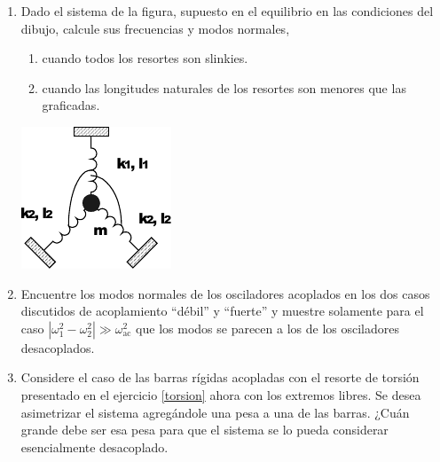 \documentclass[11pt,spanish,a4paper]{article}
\begin{document}
\begin{enumerate}
\item Dado el sistema de la figura, supuesto en el equilibrio en las condiciones del dibujo, calcule sus frecuencias y modos normales,
	\begin{enumerate}
		\item cuando todos los resortes son slinkies.
		\item cuando las longitudes naturales de los resortes son menores que las graficadas.
	\end{enumerate}
    \begin{center}
		\includegraphics[width=0.25\linewidth]{g02e07}
	\end{center}


\item Encuentre los modos normales de los osciladores acoplados en los dos casos discutidos de acoplamiento ``débil'' y ``fuerte'' y muestre solamente para el caso \(\left| \omega_1^2 - \omega_2^2 \right|\gg \omega_\mathrm{ac}^2 \) que los modos se parecen a los de los osciladores desacoplados.


\item Considere el caso de las barras rígidas acopladas con el resorte de torsión presentado en el ejercicio \ref{torsion} ahora con los extremos libres. Se desea asimetrizar el sistema agregándole una pesa a una de las barras. ¿Cuán grande debe ser esa pesa para que el sistema se lo pueda considerar esencialmente desacoplado.



\end{enumerate}
\end{document}
